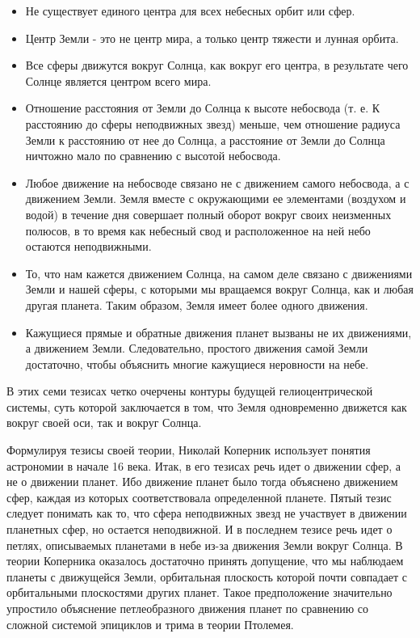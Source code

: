 \documentclass[a4paper, 14pt]{extreport}
\begin{document}
\begin{itemize}

\item
  Не существует единого центра для всех небесных орбит или сфер.
\item
  Центр Земли - это не центр мира, а только центр тяжести и лунная
  орбита.
\item
  Все сферы движутся вокруг Солнца, как вокруг его центра, в результате
  чего Солнце является центром всего мира.
\item
  Отношение расстояния от Земли до Солнца к высоте небосвода (т. е. К
  расстоянию до сферы неподвижных звезд) меньше, чем отношение радиуса
  Земли к расстоянию от нее до Солнца, а расстояние от Земли до Солнца
  ничтожно мало по сравнению с высотой небосвода.
\item
  Любое движение на небосводе связано не с движением самого небосвода, а
  с движением Земли. Земля вместе с окружающими ее элементами (воздухом
  и водой) в течение дня совершает полный оборот вокруг своих неизменных
  полюсов, в то время как небесный свод и расположенное на ней небо
  остаются неподвижными.
\item
  То, что нам кажется движением Солнца, на самом деле связано с
  движениями Земли и нашей сферы, с которыми мы вращаемся вокруг Солнца,
  как и любая другая планета. Таким образом, Земля имеет более одного
  движения.
\item
  Кажущиеся прямые и обратные движения планет вызваны не их движениями,
  а движением Земли. Следовательно, простого движения самой Земли
  достаточно, чтобы объяснить многие кажущиеся неровности на небе.
\end{itemize}

В этих семи тезисах четко очерчены контуры будущей гелиоцентрической
системы, суть которой заключается в том, что Земля одновременно движется
как вокруг своей оси, так и вокруг Солнца.

Формулируя тезисы своей теории, Николай Коперник использует понятия
астрономии в начале 16 века. Итак, в его тезисах речь идет о движении
сфер, а не о движении планет. Ибо движение планет было тогда объяснено
движением сфер, каждая из которых соответствовала определенной планете.
Пятый тезис следует понимать как то, что сфера неподвижных звезд не
участвует в движении планетных сфер, но остается неподвижной. И в
последнем тезисе речь идет о петлях, описываемых планетами в небе из-за
движения Земли вокруг Солнца. В теории Коперника оказалось достаточно
принять допущение, что мы наблюдаем планеты с движущейся Земли,
орбитальная плоскость которой почти совпадает с орбитальными плоскостями
других планет. Такое предположение значительно упростило объяснение
петлеобразного движения планет по сравнению со сложной системой
эпициклов и трима в теории Птолемея.
\end{document}
